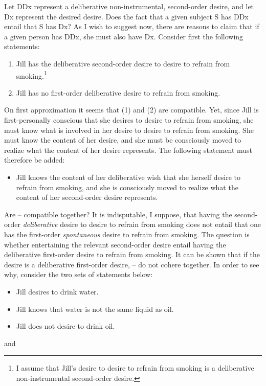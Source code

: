 \documentclass[output=paper,colorlinks,citecolor=brown
]{langscibook}
\begin{document}
Let DDx represent a deliberative non-instrumental, second-order desire, and let Dx represent the desired desire. Does the fact that a given subject S has DDx entail that S has Dx? As I wish to suggest now, there are reasons to claim that if a given person has DDx, she must also have Dx.
Consider first the following statements:

\begin{enumerate}
\item[1.]\label{item-jill-one}	Jill has the deliberative second-order desire to desire to refrain from smoking.\footnote{I assume that Jill's desire to desire to refrain from smoking is a deliberative non-instrumental second-order desire.}

\item[2.]\label{item-jill-two}	Jill has no first-order deliberative desire to refrain from smoking. 
\end{enumerate}

On first approximation it seems that (1) and (2) are compatible. Yet, since Jill is first-personally conscious that she desires to desire to refrain from smoking, she must know what is involved in her desire to desire to refrain from smoking. She must know the content of her desire, and she must be consciously moved to realize what the content of her desire represents. The following statement must therefore be added: 

\begin{itemize}
\item[3.]\label{item-jill-three}	Jill knows the content of her deliberative wish that she herself desire to refrain from smoking, and she is consciously moved to realize what the content of her second-order desire represents. 
\end{itemize}

Are -- compatible together? It is indisputable, I suppose, that having the second-order \textit{deliberative} desire to desire to refrain from smoking does not entail that one has the first-order \textit{spontaneous} desire to refrain from smoking. The question is whether entertaining the relevant second-order desire entail having the deliberative first-order desire to refrain from smoking. It can be shown that if the desire is a deliberative first-order desire, -- do not cohere together. In order to see why, consider the two sets of statements below:

\begin{itemize}
\item[4.]\label{item-jill-four}	Jill desires to drink water.

\item[5.]\label{item-jill5}	Jill knows that water is not the same liquid as oil. 

\item[6.]\label{item-jill-six}	Jill does not desire to drink oil.
\end{itemize}
\noindent
and
\end{document}
